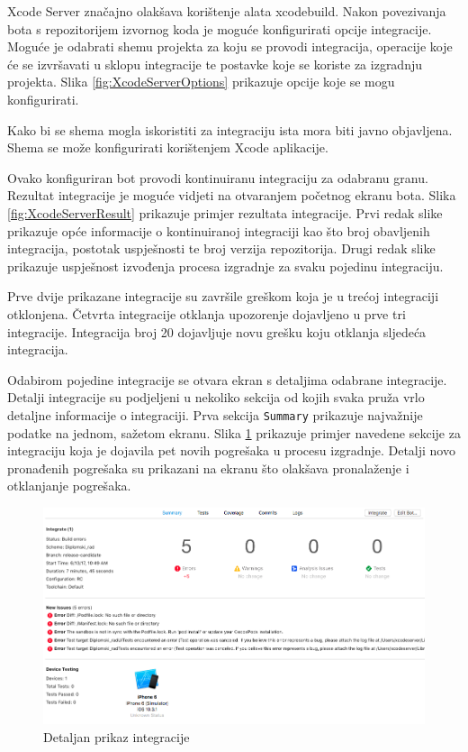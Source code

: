 \documentclass[times, utf8, diplomski, numeric]{fer}
\begin{document}
Xcode Server značajno olakšava korištenje alata xcodebuild. Nakon povezivanja bota s repozitorijem izvornog koda je moguće konfigurirati opcije integracije. Moguće je odabrati shemu projekta za koju se provodi integracija, operacije koje će se izvršavati u sklopu integracije te postavke koje se koriste za izgradnju projekta. Slika \ref{fig:XcodeServerOptions} prikazuje opcije koje se mogu konfigurirati.

Kako bi se shema mogla iskoristiti za integraciju ista mora biti javno objavljena. Shema se može konfigurirati korištenjem Xcode aplikacije.

Ovako konfiguriran bot provodi kontinuiranu integraciju za odabranu granu. Rezultat integracije je moguće vidjeti na otvaranjem početnog ekranu bota. Slika \ref{fig:XcodeServerResult} prikazuje primjer rezultata integracije. Prvi redak slike prikazuje opće informacije o kontinuiranoj integraciji kao što broj obavljenih integracija, postotak uspješnosti te broj verzija repozitorija. Drugi redak slike prikazuje uspješnost izvođenja procesa izgradnje za svaku pojedinu integraciju.

Prve dvije prikazane integracije su završile greškom koja je u trećoj integraciji otklonjena. Četvrta integracije otklanja upozorenje dojavljeno u prve tri integracije. Integracija broj 20 dojavljuje novu grešku koju otklanja sljedeća integracija.

Odabirom pojedine integracije se otvara ekran s detaljima odabrane integracije. Detalji integracije su podjeljeni u nekoliko sekcija od kojih svaka pruža vrlo detaljne informacije o integraciji. Prva sekcija \verb|Summary| prikazuje najvažnije podatke na jednom, sažetom ekranu. Slika \ref{fig:XcodeServerSingleIntegration} prikazuje primjer navedene sekcije za integraciju koja je dojavila pet novih pogrešaka u procesu izgradnje. Detalji novo pronađenih pogrešaka su prikazani na ekranu što olakšava pronalaženje i otklanjanje pogrešaka.

\begin{figure}
\centering
\includegraphics[scale=0.4]{XcodeServerSingleIntegration}
\caption{Detaljan prikaz integracije}
\label{fig:XcodeServerSingleIntegration}
\end{figure}
\end{document}
